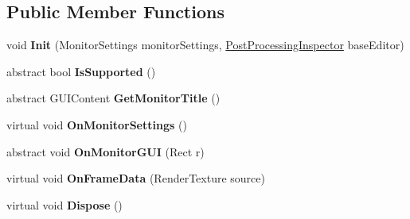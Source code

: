 \subsection*{Public Member Functions}
\begin{DoxyCompactItemize}
\item 
\mbox{\label{class_unity_editor_1_1_post_processing_1_1_post_processing_monitor_a7772670b4fd34e76a0cb35d372ed1718}} 
void {\bfseries Init} (Monitor\+Settings monitor\+Settings, \mbox{\hyperlink{class_unity_editor_1_1_post_processing_1_1_post_processing_inspector}{Post\+Processing\+Inspector}} base\+Editor)
\item 
\mbox{\label{class_unity_editor_1_1_post_processing_1_1_post_processing_monitor_ab308a1c99994f4708f5502ddc640dc0a}} 
abstract bool {\bfseries Is\+Supported} ()
\item 
\mbox{\label{class_unity_editor_1_1_post_processing_1_1_post_processing_monitor_a4fb67dcd17b84d422c69f98159e20545}} 
abstract G\+U\+I\+Content {\bfseries Get\+Monitor\+Title} ()
\item 
\mbox{\label{class_unity_editor_1_1_post_processing_1_1_post_processing_monitor_a40e1d68334826b54634a87837cc4ef89}} 
virtual void {\bfseries On\+Monitor\+Settings} ()
\item 
\mbox{\label{class_unity_editor_1_1_post_processing_1_1_post_processing_monitor_a51ecfadbfa10eb105e8c708b4d7064c4}} 
abstract void {\bfseries On\+Monitor\+G\+UI} (Rect r)
\item 
\mbox{\label{class_unity_editor_1_1_post_processing_1_1_post_processing_monitor_a490e202a0b1d45fdbc073d6000a7e220}} 
virtual void {\bfseries On\+Frame\+Data} (Render\+Texture source)
\item 
\mbox{\label{class_unity_editor_1_1_post_processing_1_1_post_processing_monitor_a89c45fe9fe5a185eb55ef522cba5dec5}} 
virtual void {\bfseries Dispose} ()
\end{DoxyCompactItemize}

